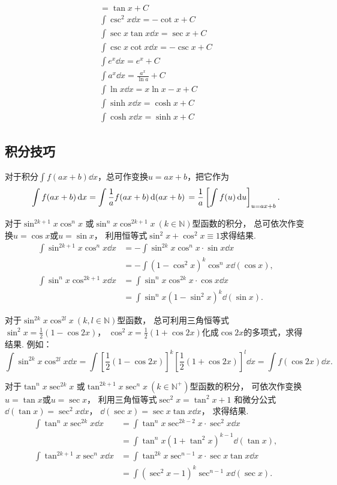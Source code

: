 \begin{gather*}
	= \tan x + C \\
	\int \csc^2 x \dd{x}
	= -\cot x + C \\
	\int \sec x \tan x \dd{x}
	= \sec x + C \\
	\int \csc x \cot x \dd{x}
	= -\csc x + C \\
	\int e^x \dd{x}
	= e^x + C \\
	\int a^x \dd{x}
	= \frac{a^x}{\ln a} + C \\
	\int \ln x \dd{x}
	= x \ln x - x + C \\
	\int \sinh x \dd{x}
	= \cosh x + C \\
	\int \cosh x \dd{x}
	= \sinh x + C
\end{gather*}

\subsection{积分技巧}
对于积分\(\int f(ax+b) \dd{x}\)，总可作变换\(u=ax+b\)，把它作为\[
	\int f(ax+b) \dd{x}
	= \int \frac{1}{a} f(ax+b) \dd{(ax+b)} \\
	= \frac{1}{a} \left[ \int f(u) \dd{u} \right]_{u=ax+b}.
\]

对于\(\sin^{2k+1} x \cos^n x\)
或\(\sin^n x \cos^{2k+1} x\ (k \in \mathbb{N})\)型函数的积分，
总可依次作变换\(u=\cos x\)或\(u=\sin x\)，
利用恒等式\(\sin^2 x + \cos^2 x \equiv 1\)求得结果.
\begin{align*}
	\int \sin^{2k+1} x \cos^n x \dd{x}
	&= - \int \sin^{2k} x \cos^n x \cdot \sin x \dd{x} \\
	&= - \int (1-\cos^2 x)^k \cos^n x \dd(\cos x), \\
	\int \sin^n x \cos^{2k+1} x \dd{x}
	&= \int \sin^n x \cos^{2k} x \cdot \cos x \dd{x} \\
	&= \int \sin^n x (1-\sin^2 x)^k \dd(\sin x).
\end{align*}

对于\(\sin^{2k} x \cos^{2l} x\ (k,l \in \mathbb{N})\)型函数，
总可利用三角恒等式\(\sin^2 x = \frac{1}{2}(1-\cos 2x)\)，
\(\cos^2 x = \frac{1}{2}(1+\cos 2x)\)化成\(\cos 2x\)的多项式，求得结果.
例如：\[
	\int \sin^{2k} x \cos^{2l} x \dd{x}
	= \int \left[\frac{1}{2}(1-\cos 2x)\right]^k
		\left[\frac{1}{2}(1+\cos 2x)\right]^l \dd{x}
	= \int f(\cos 2x) \dd{x}.
\]

对于\(\tan^n x \sec^{2k} x\)
或\(\tan^{2k+1} x \sec^n x\ (k \in \mathbb{N}^+)\)型函数的积分，
可依次作变换\(u=\tan x\)或\(u=\sec x\)，
利用三角恒等式\(\sec^2 x = \tan^2 x + 1\)
和微分公式\(\dd(\tan x) = \sec^2 x \dd{x}\)，
\(\dd(\sec x) = \sec x \tan x \dd{x}\)，
求得结果.
\begin{align*}
	\int \tan^n x \sec^{2k} x \dd{x}
	&=\int \tan^n x\sec^{2k-2} x \cdot \sec^2 x \dd{x} \\
	&=\int \tan^n x(1+\tan^2 x)^{k-1} \dd(\tan x), \\
	\int \tan^{2k+1} x \sec^n x \dd{x}
	&=\int \tan^{2k} x \sec^{n-1} x \cdot \sec x\tan x\dd{x} \\
	&=\int (\sec^2 x - 1)^k \sec^{n-1} x \dd(\sec x).
\end{align*}

